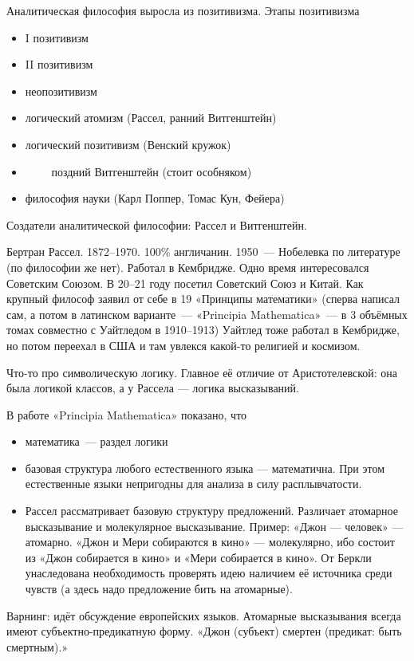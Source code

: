 
Аналитическая философия выросла из позитивизма. 
Этапы позитивизма
\begin{itemize}
	\item I позитивизм
	\item II позитивизм
	\item неопозитивизм 
	\item логический атомизм (Рассел, ранний Витгенштейн)
	\item логический позитивизм (Венский кружок)
	\item $\qquad$ поздний Витгенштейн (стоит особняком)
	\item философия науки (Карл Поппер, Томас Кун, Фейера)
\end{itemize}

Создатели аналитической философии: Рассел и Витгенштейн.

Бертран Рассел. 1872--1970. 100\% англичанин. 1950~--- Нобелевка по литературе (по философии же нет).
Работал в Кембридже. Одно время интересовался Советским Союзом. В 20--21 году посетил Советский Союз и Китай.
Как крупный философ заявил от себе в 19 «Принципы математики» (сперва написал сам, а потом в латинском варианте~--- «Principia Mathematica»~--- в 3 объёмных томах совместно с Уайтледом в 1910--1913)
Уайтлед тоже работал в Кембридже, но потом переехал в США и там увлекся какой-то религией и космизом.

Что-то про символическую логику. Главное её отличие от Аристотелевской: она была логикой классов, а у Рассела --- логика высказываний.

В работе «Principia Mathematica» показано, что 
\begin{itemize}
	\item математика~--- раздел логики
	\item базовая структура любого естественного языка --- математична. При этом естественные языки непригодны для анализа в силу расплывчатости. 
	\item Рассел рассматривает базовую структуру предложений. Различает атомарное высказывание и молекулярное высказывание. Пример: «Джон --- человек» --- атомарно. «Джон и Мери собираются в кино» --- молекулярно, ибо состоит из «Джон собирается в кино» и «Мери собирается в кино». От Беркли унаследована необходимость проверять идею наличием её источника среди чувств (а здесь надо предложение бить на атомарные).
\end{itemize}
Варнинг: идёт обсуждение европейских языков. 
Атомарные высказывания всегда имеют субъектно-предикатную форму. «Джон (субъект) смертен (предикат: быть смертным).»

